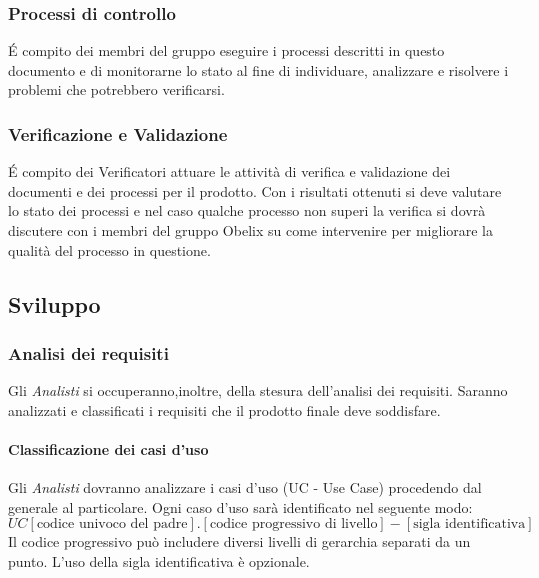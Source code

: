 

\subsubsection{Processi di controllo}

\'E compito dei membri del gruppo eseguire i processi descritti in questo documento e di monitorarne lo stato al fine di individuare, analizzare e risolvere i problemi che potrebbero verificarsi.

\subsubsection{Verificazione e Validazione}

\'E compito dei Verificatori attuare le attività di verifica e validazione dei documenti e dei processi per il prodotto.
Con i risultati ottenuti si deve valutare lo stato dei processi e nel caso qualche processo non superi la verifica si dovrà discutere con i membri del gruppo Obelix su come intervenire per migliorare la qualità del processo in questione.







\subsection{Sviluppo}

\subsubsection{Analisi dei requisiti}

Gli \emph{Analisti} si occuperanno,inoltre, della stesura dell'analisi dei
requisiti. Saranno analizzati e classificati i requisiti che il
prodotto finale deve soddisfare.


\paragraph{Classificazione dei casi d'uso} 

Gli \emph{Analisti} dovranno analizzare i
casi d'uso (UC - Use Case) procedendo dal generale al particolare. Ogni
caso d'uso sarà identificato nel seguente modo: 
$$ UC[\text{codice univoco del padre}].[\text{codice progressivo di livello}]-[\text{sigla identificativa}] $$ 
Il codice progressivo può includere diversi livelli di gerarchia
separati da un punto. L'uso della sigla identificativa è
opzionale.

